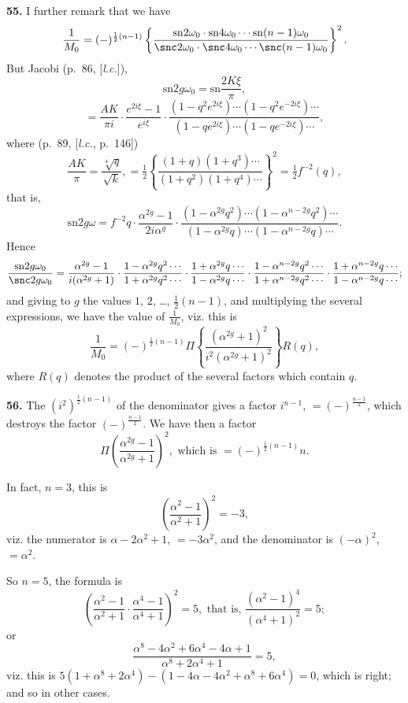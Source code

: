 \documentclass[11pt,a4paper]{book}
\providecommand{\sn}{\mathrm{sn}}
\begin{document}
\textbf{55.} I further remark that we have
\[
\frac{1}{M_0} = (-)^{\frac{1}{2}(n-1)}
\left\{\frac{\sn 2\omega_0 \cdot \sn 4\omega_0 \cdots \sn (n-1)\omega_0}
{\snc 2\omega_0 \cdot \snc 4\omega_0 \cdots \snc (n-1)\omega_0}\right\}^2.
\]
But Jacobi (p.~86, [\textit{l.c.}]),
\[
\sn 2g\omega_0 = \sn \frac{2K\xi}{\pi},
\]
\[
= \frac{AK}{\pi i} \cdot \frac{e^{2i\xi} - 1}{e^{i\xi}} \cdot
\frac{(1 - q^2 e^{2i\xi}) \cdots (1 - q^2 e^{-2i\xi}) \cdots}
{(1 - qe^{2i\xi}) \cdots (1 - qe^{-2i\xi}) \cdots},
\]
where (p.~89, [\textit{l.c.}, p.~146])
\[
\frac{AK}{\pi} = \frac{\sqrt[4]{q}}{\sqrt{k}},
= \tfrac{1}{2}\left\{\frac{(1 + q)(1 + q^3) \cdots}{(1 + q^2)(1 + q^4) \cdots}\right\}^2
= \tfrac{1}{2}f^{-2}(q),
\]
that is,
\[
\sn 2g\omega = f^{-2}q \cdot \frac{\alpha^{2g} - 1}{2i\alpha^g} \cdot
\frac{(1 - \alpha^{2g}q^2) \cdots (1 - \alpha^{n-2g}q^2) \cdots}
{(1 - \alpha^{2g}q) \cdots (1 - \alpha^{n-2g}q) \cdots}.
\]
Hence
\[
\frac{\sn 2g\omega_0}{\snc 2g\omega_0}
= \frac{\alpha^{2g} - 1}{i(\alpha^{2g} + 1)} \cdot
\frac{1 - \alpha^{2g}q^2 \cdots}{1 + \alpha^{2g}q^2 \cdots} \cdot
\frac{1 + \alpha^{2g}q \cdots}{1 - \alpha^{2g}q \cdots} \cdot
\frac{1 - \alpha^{n-2g}q^2 \cdots}{1 + \alpha^{n-2g}q^2 \cdots} \cdot
\frac{1 + \alpha^{n-2g}q \cdots}{1 - \alpha^{n-2g}q \cdots};
\]
and giving to $g$ the values $1$, $2$, \ldots, $\frac{1}{2}(n-1)$, and multiplying the several expressions, we have the value of $\frac{1}{M_0}$, viz. this is
\[
\frac{1}{M_0} = (-)^{\frac{1}{2}(n-1)}
\Pi \left\{\frac{(\alpha^{2g} + 1)^2}{i^2(\alpha^{2g} + 1)^2}\right\} R(q),
\]
where $R(q)$ denotes the product of the several factors which contain $q$.

\textbf{56.} The $(i^2)^{\frac{1}{2}(n-1)}$ of the denominator gives a factor $i^{n-1}$, $= (-)^{\frac{n-1}{2}}$, which destroys the factor $(-)^{\frac{n-1}{2}}$. We have then a factor
\[
\Pi \left(\frac{\alpha^{2g} - 1}{\alpha^{2g} + 1}\right)^2, \text{ which is } = (-)^{\frac{1}{2}(n-1)} n.
\]

In fact, $n = 3$, this is
\[
\left(\frac{\alpha^2 - 1}{\alpha^2 + 1}\right)^2 = -3,
\]
viz. the numerator is $\alpha - 2\alpha^2 + 1$, $= -3\alpha^2$, and the denominator is $(-\alpha)^2$, $= \alpha^2$.

So $n = 5$, the formula is
\[
\left(\frac{\alpha^2 - 1}{\alpha^2 + 1} \cdot \frac{\alpha^4 - 1}{\alpha^4 + 1}\right)^2 = 5,
\text{ that is, } \frac{(\alpha^2 - 1)^4}{(\alpha^4 + 1)^2} = 5;
\]
or
\[
\frac{\alpha^8 - 4\alpha^2 + 6\alpha^4 - 4\alpha + 1}{\alpha^8 + 2\alpha^4 + 1} = 5,
\]
viz. this is $5(1 + \alpha^8 + 2\alpha^4) - (1 - 4\alpha - 4\alpha^2 + \alpha^8 + 6\alpha^4) = 0$, which is right; and so in other cases.
\end{document}
